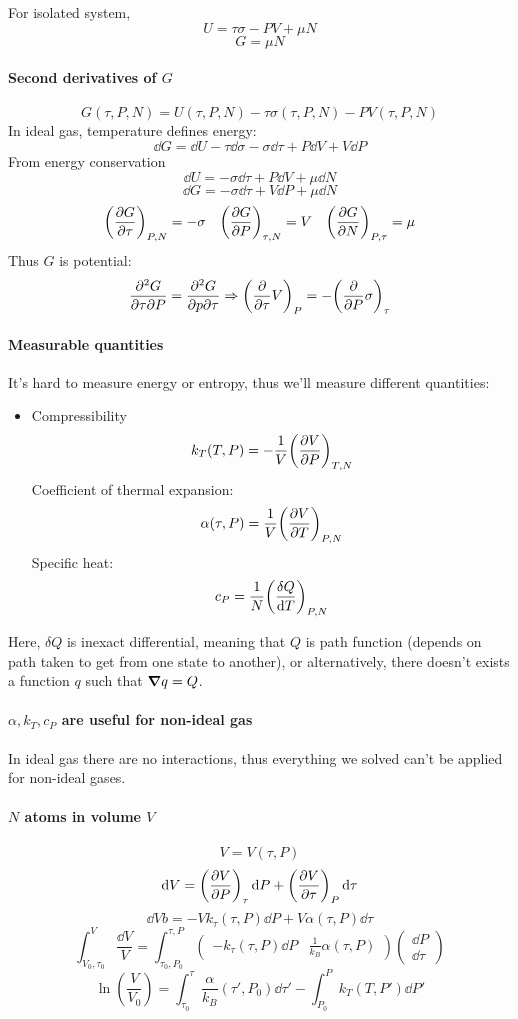  For isolated system,
$$U = \tau \sigma - PV + \mu N$$
$$G = \mu N$$

\paragraph{Second derivatives of $G$}
$$G(\tau, P, N) = U(\tau, P, N) - \tau \sigma(\tau, P, N) -  PV(\tau, P, N)$$
In ideal gas, temperature defines energy:
$$\dd{G} =\dd{U} - \tau \dd{\sigma} - \sigma \dd{\tau} + P\dd{V} +V\dd{P}$$
From energy conservation
$$\dd{U} =  - \sigma \dd{\tau} + P\dd{V} +\mu\dd{N}$$
$$\dd{G} = - \sigma \dd{\tau} + V\dd{P} + \mu \dd{N}$$
$$\qty(\pdv{G}{\tau})_{P,N} = -\sigma \quad \qty(\pdv{G}{P})_{\tau,N} = V \quad \qty(\pdv{G}{N})_{P,\tau} = \mu$$
Thus $G$ is potential:
$$\pdv{G}{\tau}{P} = \pdv{G}{p}{\tau} \Rightarrow \qty(\pdv{\tau} V)_P = -\qty(\pdv{P} \sigma)_\tau$$
\paragraph{Measurable quantities}
It's hard to measure energy or entropy, thus we'll measure different quantities:

\begin{itemize}
	\item Compressibility
	$$k_T(T,P) = -\frac{1}{V} \qty(\pdv{V}{P})_{T,N}$$
	Coefficient of thermal expansion:
	$$\alpha(\tau,P) = \frac{1}{V} \qty(\pdv{V}{T})_{P,N}$$
	Specific heat:
	$$c_P = \frac{1}{N} \qty(\frac{\delta Q}{\dd{T}})_{P,N}$$
\end{itemize}

Here, $\delta Q$ is inexact differential, meaning that $Q$ is path function (depends on path taken to get from one state to another), or alternatively, there doesn't exists a function $q$ such that $\grad{q}=Q$.
\paragraph{$\alpha, k_T, c_P$ are useful for non-ideal gas}
In ideal gas there are no interactions, thus everything we solved can't be applied for non-ideal gases.
\paragraph{$N$ atoms in volume $V$}
$$V = V(\tau,P)$$
$$\dd{V} = \qty(\pdv{V}{P})_\tau \dd{P} +\qty(\pdv{V}{\tau})_P \dd{\tau}$$
$$\dd{V}b= -Vk_{\tau}(\tau,P) \dd{P} + V\alpha(\tau, P) \dd{\tau}$$
$$\int_{V_0,\tau_0}^V \frac{\dd{V}}{V} = \int_{\tau_0,P_0}^{\tau, P} \begin{pmatrix}-k_{\tau}(\tau,P) \dd{P} & \frac{1}{k_B}\alpha(\tau, P)\end{pmatrix}\begin{pmatrix}
\dd{P}\\\dd{\tau}
\end{pmatrix}$$
$$\ln(\frac{V}{V_0}) = \int_{\tau_0}^\tau \frac{\alpha}{k_B} (\tau', P_0) \dd{\tau'} - \int_{P_0}^P k_T (T,P') \dd{P'}$$
